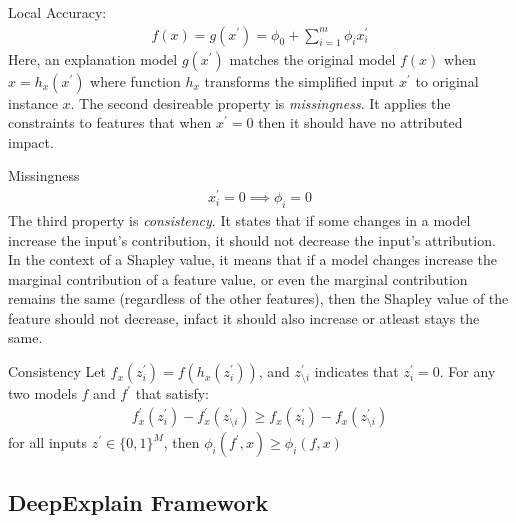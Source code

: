 \documentclass[english]{tktltiki2}
\theoremstyle{definition}
\theoremstyle{remark}
\begin{document}
\begin{properties} \label{prop:all_properties}
\item Local Accuracy:
\begin{align*}
	f(x) = g(x^\prime) =  \phi_0 + \sum_{i=1}^{m} \phi_i x_i^\prime 
\end{align*}
Here, an explanation model $g(x^\prime)$ matches the original model $f(x)$ when $x = h_x(x^\prime)$ where function $h_x$ transforms the simplified input $x^\prime$ to original instance $x$.
The second desireable property is \textit{missingness}. It applies the constraints to features that when $x^\prime = 0$ then it should have no attributed impact.
\item Missingness
\begin{align*}
	x_i^\prime = 0 \implies \phi_i = 0
\end{align*}
The third property is \textit{consistency}. It states that if some changes in a model increase the input's contribution, it should not decrease the input's attribution. In the context of a Shapley value, it means that if a model changes increase the marginal contribution of a feature value, or even the marginal contribution remains the same (regardless of the other features), then the Shapley value of the feature should not decrease, infact it should also increase or atleast stays the same.

\item Consistency
Let $f_x(z_i^\prime) = f(h_x(z_i^\prime))$, and $z^\prime_{\setminus i}$ indicates that $z^\prime_i = 0$. For any two models $f$ and $f^\prime$ that satisfy:
\begin{align*}
	f^\prime_x(z_i^\prime) - f^\prime_x(z^\prime_{\setminus i}) \geq f_x(z_i^\prime) - f_x(z^\prime_{\setminus i})
\end{align*}
for all inputs $z^\prime \in \{0,1\}^{M}$, then $\phi_i(f^\prime, x) \geq \phi_i(f, x)$
\end{properties}

\subsection{DeepExplain Framework}\label{sec:DeepExplain}
\end{document}
